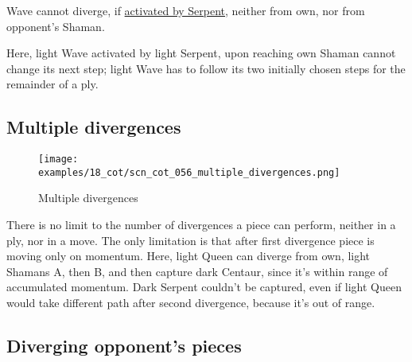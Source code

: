\vspace*{-0.5\baselineskip}
Wave cannot diverge, if
\hyperref[fig:scn_tr_31_serpent_activating_wave]{activated by Serpent},
neither from own, nor from opponent's Shaman.

Here, light Wave activated by light Serpent, upon reaching own Shaman cannot change
its next step; light Wave has to follow its two initially chosen steps for the
remainder of a ply.

\clearpage %

\subsection*{Multiple divergences}
\label{sec:Conquest of Tlalocan/Divergence/Multiple divergences}

\vspace*{-1.4\baselineskip}
\noindent
\begin{figure}[!h]
\texttt{[image: examples/18\_cot/scn\_cot\_056\_multiple\_divergences.png]}
\vspace*{-1.3\baselineskip}
\caption{Multiple divergences}
\label{fig:scn_cot_056_multiple_divergences}
\end{figure}

\vspace*{-0.5\baselineskip}
There is no limit to the number of divergences a piece can perform, neither in a ply,
nor in a move. The only limitation is that after first divergence piece is moving
only on momentum. \newline
\indent
Here, light Queen can diverge from own, light Shamans A, then B, and then capture
dark Centaur, since it's within range of accumulated momentum. Dark Serpent couldn't
be captured, even if light Queen would take different path after second divergence,
because it's out of range.

\clearpage %

\subsection*{Diverging opponent's pieces}
\label{sec:Conquest of Tlalocan/Divergence/Diverging opponent's pieces}

